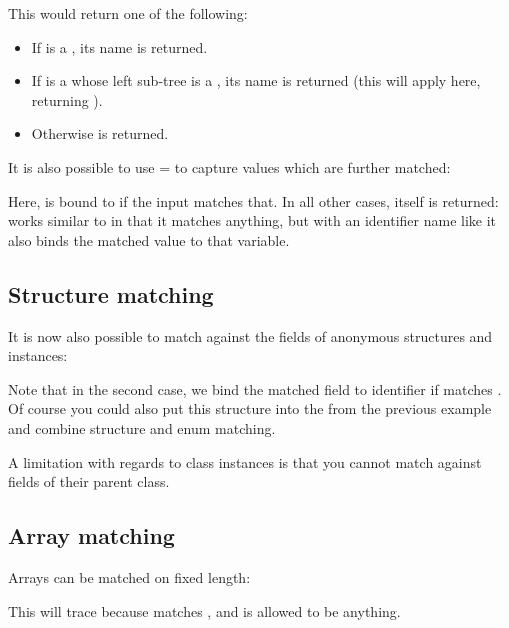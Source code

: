 \documentclass{haxe}
\begin{document}
This would return one of the following:

\begin{itemize}
	\item If  is a , its name is returned.
	\item If  is a  whose left sub-tree is a , its name is returned (this will apply here, returning ).
	\item Otherwise  is returned.
\end{itemize}

It is also possible to use = to capture values which are further matched:


Here,  is bound to  if the input matches that. In all other cases,  itself is returned:  works similar to  in that it matches anything, but with an identifier name like  it also binds the matched value to that variable.

\subsection{Structure matching}
\label{lf-pattern-matching-structure}

It is now also possible to match against the fields of anonymous structures and instances:


Note that in the second case, we bind the matched  field to identifier  if  matches . Of course you could also put this structure into the  from the previous example and combine structure and enum matching.

A limitation with regards to class instances is that you cannot match against fields of their parent class.

\subsection{Array matching}
\label{lf-pattern-matching-array}

Arrays can be matched on fixed length:


This will trace  because  matches , and  is allowed to be anything.
\end{document}
